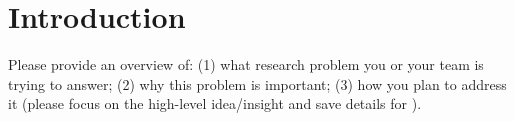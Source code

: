 \section{Introduction}
\label{sec:introduction}

Please provide an overview of:
(1) what research problem you or your team is trying to answer; (2) why this problem is important; (3) how you plan to address it (please focus on the high-level idea/insight and save details for ).

